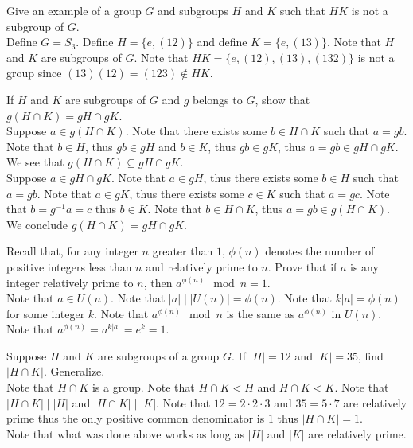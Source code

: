 \documentclass[12pt]{article}
\makeatletter
\theoremstyle{homework}
\newenvironment{exercise}[1]
{\def\@currentlabel{#1}\exercisecore}
{\endexercisecore}
\makeatother
\begin{document}
\begin{exercise}{7.10}
Give an example of a group $G$ and subgroups $H$ and $K$ such that $HK$ is not a subgroup of $G$.\\
Define $G=S_3$.  Define $H=\{e,(12)\}$ and define $K=\{e,(13)\}$.  Note that $H$ and $K$ are subgroups of $G$.  Note that $HK=\{e,(12),(13),(132)\}$ is not a group since $(13)(12)=(123)\not\in HK$.
\end{exercise}

\begin{exercise}{7.11}
If $H$ and $K$ are subgroups of $G$ and $g$ belongs to $G$, show that $g(H \cap K) = gH \cap gK$.\\
Suppose $a\in g(H \cap K)$.  Note that there exists some $b\in H \cap K$ such that $a=gb$.  Note that $b\in H$, thus $gb\in gH$ and $b\in K$, thus $gb\in gK$, thus $a=gb\in gH \cap gK$.  We see that $g(H \cap K) \subseteq gH \cap gK$.\\
Suppose $a\in gH \cap gK$.  Note that $a\in gH$, thus there exists some $b\in H$ such that $a=gb$.  Note that $a\in gK$, thus there exists some $c\in K$ such that $a=gc$.  Note that $b=g^{-1}a=c$ thus $b\in K$.  Note that $b\in H \cap K$, thus $a=gb\in g(H \cap K)$.  We conclude $g(H \cap K) = gH \cap gK$.
\end{exercise}

\begin{exercise}{7.18}
Recall that, for any integer $n$ greater than $1$, $\phi(n)$ denotes the number of positive integers less than $n$ and relatively prime to $n$. Prove that if $a$ is any integer relatively prime to $n$, then $a^{\phi(n)} \mod n = 1$.\\
Note that $a\in U(n)$.  Note that $|a|\mid |U(n)|=\phi(n)$.  Note that $k|a|=\phi(n)$ for some integer $k$.  Note that $a^{\phi(n)} \mod n$ is the same as $a^{\phi(n)}$ in $U(n)$.  Note that $a^{\phi(n)}=a^{k|a|}=e^k=1$.
\end{exercise}

\begin{exercise}{7.22}
Suppose $H$ and $K$ are subgroups of a group $G$. If $|H| = 12$ and $|K| = 35$, find $|H \cap K|$. Generalize.\\
Note that $H \cap K$ is a group.  Note that $H \cap K<H$ and $H \cap K<K$.  Note that $|H \cap K|\mid |H|$ and $|H \cap K|\mid |K|$.  Note that $12=2\cdot 2\cdot 3$ and $35=5\cdot 7$ are relatively prime thus the only positive common denominator is $1$ thus $|H \cap K|=1$.\\
Note that what was done above works as long as $|H|$ and $|K|$ are relatively prime.
\end{exercise}
\end{document}
